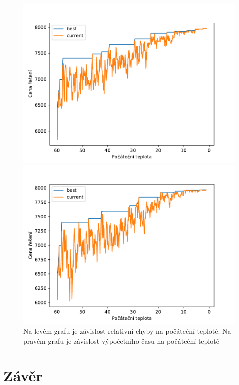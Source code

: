 \documentclass[11pt]{article}
\begin{document}
\begin{figure}
\begin{minipage}[c]{0.325\textwidth}
        \centering \includegraphics[width=\textwidth]{img/C240.pdf} 
    \end{minipage}
    \begin{minipage}[c]{0.325\textwidth}
        \centering \includegraphics[width=\textwidth]{img/C300.pdf} 
    \end{minipage}
   \caption{Na levém grafu je závislost relativní chyby na počáteční teplotě. Na pravém grafu je závislost výpočetního času na počáteční teplotě}\label{fig:GVI}
\end{figure} 

    
  
\section{Závěr}
\end{document}
